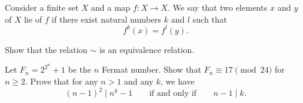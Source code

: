 \begin{foundational}
  \exercise Consider a finite set $X$ and a map $f:X\to X$. We say that two elements $x$ and $y$ of $X$ lie  of $f$ if there exist natural numbers $k$ and $l$ such that
  \begin{equation*}
    f^k(x)=f^l(y).
  \end{equation*}
  \begin{subexenum}
  \item Show that the relation $\sim$ is an equivalence relation.
  \end{subexenum}
\end{foundational}

\begin{challenge}
  \exercise Let $F_n=2^{2^n}+1$ be the $n$\supth{} Fermat number. Show that $F_n\equiv 17\pmod{24}$ for $n\geq 2$.
  \exercise Prove that for any $n>1$ and any $k$, we have
  \begin{equation*}
    (n-1)^2\mid n^k-1\qquad\text{if and only if}\qquad n-1\mid k.
  \end{equation*}
\end{challenge}

